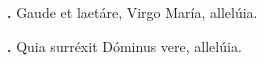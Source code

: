 \textbf{\Vbar.} Gaude et laetáre, Virgo María, allelúia.

\textbf{\Rbar.} Quia surréxit Dóminus vere, allelúia.

